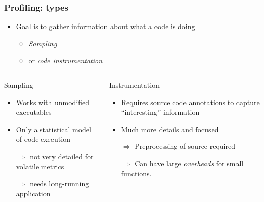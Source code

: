 \documentclass[presentation,aspectratio=43,10pt]{beamer}
\begin{document}
\begin{frame}
  \frametitle{Profiling: types}
  \begin{itemize}
  \item Goal is to gather information about what a code is doing
    \begin{itemize}
    \item \emph{Sampling}
    \item or \emph{code instrumentation}
    \end{itemize}
  \end{itemize}
  \begin{columns}
    \begin{column}{0.45\textwidth}
      \begin{exampleblock}{Sampling}
        \begin{itemize}
        \item Works with unmodified executables
        \item Only a statistical model of code execution
        \item[$\Rightarrow$] not very detailed for volatile metrics
        \item[$\Rightarrow$] needs long-running application
        \end{itemize}
      \end{exampleblock}
    \end{column}
    \begin{column}{0.45\textwidth}
      \begin{exampleblock}{Instrumentation}
        \begin{itemize}
        \item Requires source code annotations to capture
          ``interesting'' information
        \item Much more details and focused
        \item[$\Rightarrow$] Preprocessing of source required
        \item[$\Rightarrow$] Can have large \emph{overheads} for small functions.
        \end{itemize}
      \end{exampleblock}
    \end{column}
  \end{columns}
\end{frame}
\end{document}
